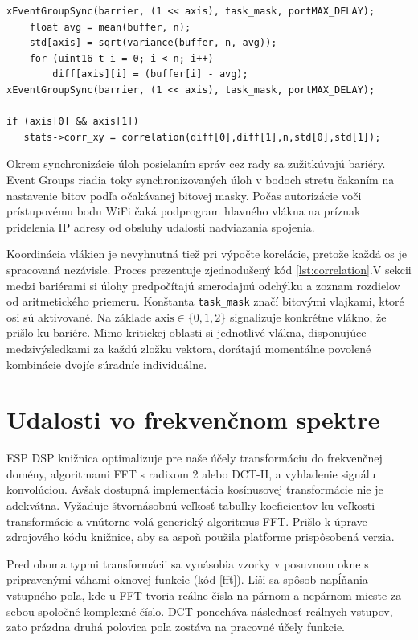 \begin{lstlisting}[style=cstyle,caption=Synchronizácia úloh na výpočet korelácie osí,label={lst:correlation},
morekeywords={xEventGroupSync}]
xEventGroupSync(barrier, (1 << axis), task_mask, portMAX_DELAY);
	float avg = mean(buffer, n);
	std[axis] = sqrt(variance(buffer, n, avg));
	for (uint16_t i = 0; i < n; i++)
		diff[axis][i] = (buffer[i] - avg);
xEventGroupSync(barrier, (1 << axis), task_mask, portMAX_DELAY);

if (axis[0] && axis[1])
   stats->corr_xy = correlation(diff[0],diff[1],n,std[0],std[1]);
\end{lstlisting}

Okrem synchronizácie úloh posielaním správ cez rady sa zužitkúvajú bariéry. Event Groups riadia toky
synchronizovaných úloh v bodoch stretu čakaním na nastavenie bitov podľa očakávanej bitovej masky. Počas
autorizácie voči prístupovému bodu WiFi čaká podprogram hlavného vlákna na príznak pridelenia IP adresy
od obsluhy udalosti nadviazania spojenia.

Koordinácia vlákien je nevyhnutná tiež pri výpočte korelácie, pretože každá os je spracovaná nezávisle. Proces
prezentuje zjednodušený kód \ref{lst:correlation}.V sekcii medzi bariérami si úlohy predpočítajú smerodajnú odchýlku a zoznam rozdielov
od aritmetického priemeru. Konštanta \verb|task_mask| značí bitovými vlajkami, ktoré osi sú aktivované.
Na základe $\mathrm{axis} \in \{0,1,2\}$ signalizuje konkrétne vlákno, že prišlo ku bariére. Mimo kritickej oblasti
si jednotlivé vlákna, disponujúce medzivýsledkami za každú zložku vektora, dorátajú momentálne povolené
kombinácie dvojíc súradníc individuálne.

\section{Udalosti vo frekvenčnom spektre}
ESP DSP knižnica optimalizuje pre naše účely transformáciu do frekvenčnej domény, algoritmami FFT s radixom 2 alebo DCT-II,
a vyhladenie signálu konvolúciou. Avšak dostupná implementácia kosínusovej transformácie nie je adekvátna.
Vyžaduje štvornásobnú veľkosť tabuľky koeficientov ku veľkosti transformácie a vnútorne volá generický
algoritmus FFT. Prišlo k úprave zdrojového kódu knižnice, aby sa aspoň použila platforme prispôsobená verzia.

Pred oboma typmi transformácii sa vynásobia vzorky v posuvnom okne s pripravenými váhami oknovej funkcie (kód \ref{fft}).
Líši sa spôsob napĺňania vstupného poľa, kde u FFT tvoria reálne čísla na párnom a nepárnom mieste za sebou
spoločné komplexné číslo. DCT ponecháva následnosť reálnych vstupov, zato prázdna druhá polovica poľa zostáva
na pracovné účely funkcie.

